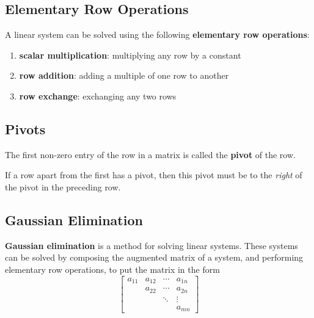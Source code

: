 \documentclass{article}
\begin{document}
\subsection{Elementary Row Operations}
\begin{definition}
    A linear system can be solved using the following
    \textbf{elementary row operations}:
    \begin{enumerate}
        \item \textbf{scalar multiplication}: multiplying any row by a
              constant
        \item \textbf{row addition}: adding a multiple of one row to
              another
        \item \textbf{row exchange}: exchanging any two rows
    \end{enumerate}
    \subsection{Pivots}
\end{definition}
\begin{definition}
    The first non-zero entry of the row in a matrix is called the
    \textbf{pivot} of the row.
\end{definition}
\begin{theorem}\label{theorem:pivots}
    If a row apart from the first has a pivot, then this pivot must be
    to the \textit{right} of the pivot in the preceding row.
\end{theorem}
\subsection{Gaussian Elimination}
\begin{definition}
    \textbf{Gaussian elimination} is a method for solving linear
    systems. These systems can be solved by composing the augmented
    matrix of a system, and performing elementary row operations, to put
    the matrix in the form
    \begin{equation*}
        \begin{bmatrix}
            a_{11} & a_{12} & \cdots & a_{1n} \\
                   & a_{22} & \cdots & a_{2n} \\
                   &        & \ddots & \vdots \\
                   &        &        & a_{mn}
        \end{bmatrix}
    \end{equation*}
\end{definition}
\end{document}
